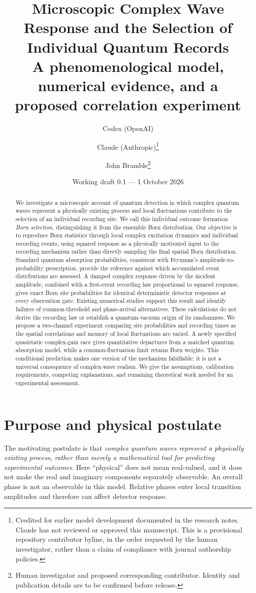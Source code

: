 \documentclass[11pt]{article}
\title{Microscopic Complex Wave Response and the Selection of Individual Quantum Records\\[6pt]\large A phenomenological model, numerical evidence, and a proposed correlation experiment}
\author{Codex (OpenAI) \and Claude (Anthropic)\thanks{Credited for earlier model development documented in the research notes. Claude has not reviewed or approved this manuscript. This is a provisional repository contributor byline, in the order requested by the human investigator, rather than a claim of compliance with journal authorship policies.} \and John Bramble\thanks{Human investigator and proposed corresponding contributor. Identity and publication details are to be confirmed before release.}}
\date{Working draft 0.1 --- 1 October 2026}
\begin{document}
\maketitle
\begin{abstract}
We investigate a microscopic account of quantum detection in which complex quantum waves represent a physically existing process and local fluctuations contribute to the selection of an individual recording site. We call this individual outcome formation \emph{Born selection}, distinguishing it from the ensemble Born distribution. Our objective is to reproduce Born statistics through local complex excitation dynamics and individual recording events, using squared response as a physically motivated input to the recording mechanism rather than directly sampling the final spatial Born distribution. Standard quantum absorption probabilities, consistent with Feynman's amplitude-to-probability prescription, provide the reference against which accumulated event distributions are assessed. A damped complex response driven by the incident amplitude, combined with a first-event recording law proportional to squared response, gives exact Born site probabilities for identical deterministic detector responses at every observation gate. Existing numerical studies support this result and identify failures of common-threshold and phase-arrival alternatives. These calculations do not derive the recording law or establish a quantum-vacuum origin of its randomness. We propose a two-channel experiment comparing site probabilities and recording times as the spatial correlations and memory of local fluctuations are varied. A newly specified quasistatic complex-gain race gives quantitative departures from a matched quantum absorption model, while a common-fluctuation limit retains Born weights. This conditional prediction makes one version of the mechanism falsifiable; it is not a universal consequence of complex-wave realism. We give the assumptions, calibration requirements, competing explanations, and remaining theoretical work needed for an experimental assessment.
\end{abstract}

\section{Purpose and physical postulate}
The motivating postulate is that \emph{complex quantum waves represent a physically existing process, rather than merely a mathematical tool for predicting experimental outcomes}. Here ``physical'' does not mean real-valued, and it does not make the real and imaginary components separately observable. An overall phase is not an observable in this model. Relative phases enter local transition amplitudes and therefore can affect detector response.
\end{document}
